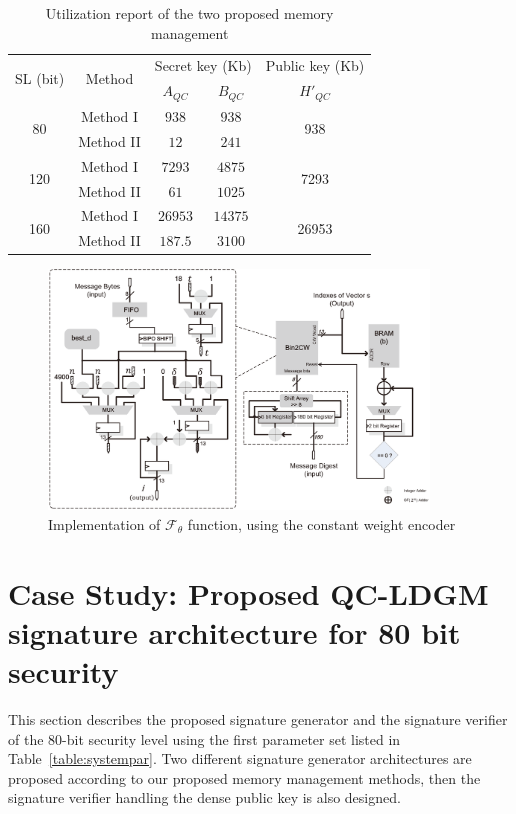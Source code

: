 \documentclass[10pt,journal,compsoc]{IEEEtran}
\begin{document}
\begin{table}[!t]\centering
\caption{Utilization report of the two proposed memory management}
\label{table:memutil}
\begin{minipage}{.5\textwidth}\centering
\begin{tabular}{ccccc}
\hline
\multirow{2}{*}{SL (bit)} &\multirow{2}{*}{Method} & \multicolumn{2}{c}{Secret key (Kb)} & Public key (Kb)\\
                            &        & $A_{QC}$ & $B_{QC}$               & $H'_{QC}$\\
\hline
\multirow{2}{*}{80} &  Method I  &  $938$  &   $938$    & \multirow{2}{*}{938}  \\
                    &  Method II   & $12$   &  $241$    &   \\
\hline
\multirow{2}{*}{120} &   Method I   &  $7293$  & $4875$        &\multirow{2}{*}{7293}   \\
                    &   Method II   &  $61$    & $1025$ &\\
\hline
\multirow{2}{*}{160} &   Method I   &  $26953$  & $14375$        &\multirow{2}{*}{26953}   \\
                     &  Method II   &  $187.5$    & $3100$  &\\
\hline
\end{tabular}
\end{minipage}
\end{table}

\begin{figure}[!htb]\centering
      \includegraphics[width=0.9\textwidth]{./fig/orthogonalfun.eps}
  \caption{Implementation of $\mathcal{F}_{\theta}$ function, using the constant weight encoder}\label{fig:orthogonalfun}
\end{figure}

\section{Case Study: Proposed QC-LDGM signature architecture for 80 bit security}
This section describes the proposed signature generator and the signature verifier of the 80-bit security level using the first parameter set listed in Table~\ref{table:systempar}\cite{baldi2013using}. Two different signature generator architectures  are proposed according to our proposed memory management methods,
then the signature verifier handling the dense public key is also designed.
\end{document}
